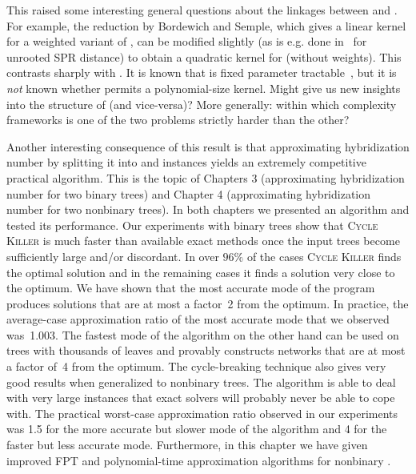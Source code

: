 This raised some interesting general questions about the linkages between \mh and \dfvs. For example, the reduction by Bordewich and Semple, which gives a linear kernel for a weighted variant of \mh, can be modified slightly (as is e.g. done in~\cite{bonet10} for unrooted SPR distance) to obtain a quadratic kernel for \mh (without weights). This contrasts sharply with \dfvs. It is known that \dfvs is fixed parameter tractable~\cite{dfvsFPT}, but it is \emph{not} known whether \dfvs permits a polynomial-size kernel. Might \mh give us new insights into the structure of \dfvs (and vice-versa)? More generally: within which complexity frameworks is one of the two problems strictly harder than the other?





Another interesting consequence of this result is that approximating hybridization number by splitting it into \maf and \dfvs instances yields an extremely competitive practical algorithm. This is the topic of Chapters 3 (approximating hybridization number for two binary trees) and Chapter 4 (approximating hybridization number for two nonbinary trees). In both chapters we presented an algorithm and tested its performance. Our experiments with binary trees show that \textsc{Cycle Killer} is much faster than available exact methods once the input trees become sufficiently large and/or discordant. In over $96\%$ of the cases \textsc{Cycle Killer} finds the optimal solution and in the remaining cases it finds a solution very close to the optimum. We have shown that the most accurate mode of the program produces solutions that are at most a factor~2 from the optimum. In practice, the average-case approximation ratio of the most accurate mode that we observed was~1.003. The fastest mode of the algorithm on the other hand can be used on trees with thousands of leaves and provably constructs networks that are at most a factor of~4 from the optimum. The cycle-breaking technique also gives very good results when generalized to nonbinary trees. The algorithm is able to deal with very large instances that exact solvers will probably never be able to cope with. The practical worst-case approximation ratio observed in our experiments was 1.5 for the more accurate but slower mode of the algorithm and 4 for the faster but less accurate mode. Furthermore, in this chapter we have given improved FPT and polynomial-time approximation algorithms for nonbinary \maf.


